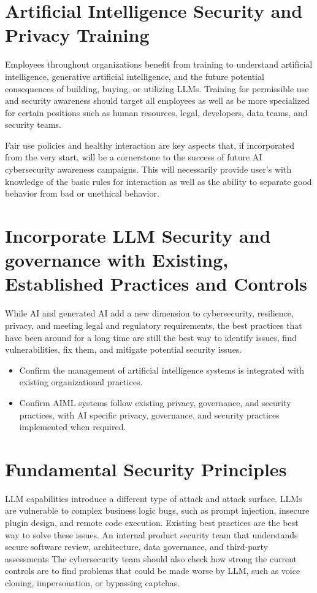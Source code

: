 \clearpage

\section{Artificial Intelligence Security and Privacy Training}
Employees throughout organizations benefit from training to understand artificial intelligence, generative artificial intelligence, and the future potential consequences of building, buying, or utilizing LLMs. Training for permissible use and security awareness should target all employees as well as be more specialized for certain positions such as human resources, legal, developers, data teams, and security teams.

Fair use policies and healthy interaction are key aspects that, if incorporated from the very start, will be a cornerstone to the success of future AI cybersecurity awareness campaigns. This will necessarily provide user's with knowledge of the basic rules for interaction as well as the ability to separate good behavior from bad or unethical behavior.


\section{Incorporate LLM Security and governance with Existing, Established Practices and Controls}
While AI and generated AI add a new dimension to cybersecurity, resilience, privacy, and meeting legal and regulatory requirements, the best practices that have been around for a long time are still the best way to identify issues, find vulnerabilities, fix them, and mitigate potential security issues.

\begin{itemize}
  \item Confirm the management of artificial intelligence systems is integrated with existing organizational practices.
  \item Confirm AIML systems follow existing privacy, governance, and security practices, with AI specific privacy, governance, and security practices implemented when required.
\end{itemize}

\section{Fundamental Security Principles}
LLM capabilities introduce a different type of attack and attack surface. LLMs are vulnerable to complex business logic bugs, such as prompt injection, insecure plugin design, and remote code execution. Existing best practices are the best way to solve these issues. An internal product security team that understands secure software review, architecture, data governance, and third-party assessments The cybersecurity team should also check how strong the current controls are to find problems that could be made worse by LLM, such as voice cloning, impersonation, or bypassing captchas.

